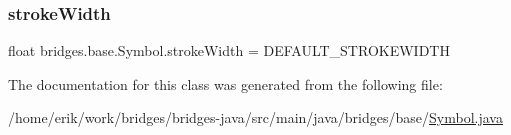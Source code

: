 \subsubsection{\texorpdfstring{stroke\+Width}{strokeWidth}}
{\footnotesize\ttfamily float bridges.\+base.\+Symbol.\+stroke\+Width = D\+E\+F\+A\+U\+L\+T\+\_\+\+S\+T\+R\+O\+K\+E\+W\+I\+D\+TH\hspace{0.3cm}{\ttfamily [protected]}}



The documentation for this class was generated from the following file\+:\begin{DoxyCompactItemize}
\item 
/home/erik/work/bridges/bridges-\/java/src/main/java/bridges/base/\hyperlink{_symbol_8java}{Symbol.\+java}\end{DoxyCompactItemize}
